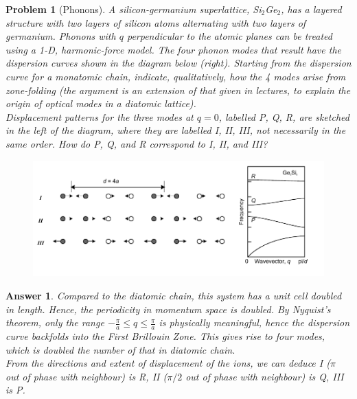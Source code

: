 \documentclass[a4paper]{article}
\newtheorem{ans}{Answer}[section]
\theoremstyle{new}
\newtheorem{qns}{Problem}[section]
\begin{document}
\begin{qns}[Phonons]
A silicon-germanium superlattice, Si$_2$Ge$_2$, has a layered structure with two layers of silicon atoms alternating with two layers of germanium. Phonons with $q$ perpendicular to the atomic planes can be treated using a 1-D, harmonic-force model. The four phonon modes that result have the dispersion curves shown in the diagram below (right). Starting from the dispersion curve for a monatomic chain, indicate, qualitatively, how the 4 modes arise from zone-folding (the argument is an extension of that given in lectures, to explain the origin of optical modes in a diatomic lattice).\\[5pt]
Displacement patterns for the three modes at $q = 0$, labelled P, Q, R, are sketched in the left of the diagram, where they are labelled I, II, III, not necessarily in the same order. How do P, Q, and R correspond to I, II, and III?
\begin{figure}[H]
    \centering
    \includegraphics[width=\linewidth]{4_5.PNG}
\end{figure}
\end{qns}
\begin{ans}
Compared to the diatomic chain, this system has a unit cell doubled in length. Hence, the periodicity in momentum space is doubled. By Nyquist's theorem, only the range $-\frac{\pi}{a}\leq q\leq\frac{\pi}{a}$ is physically meaningful, hence the dispersion curve backfolds into the First Brillouin Zone. This gives rise to four modes, which is doubled the number of that in diatomic chain.\\[5pt]
From the directions and extent of displacement of the ions, we can deduce I ($\pi$ out of phase with neighbour) is R, II ($\pi/2$ out of phase with neighbour) is Q, III is P.
\end{ans}
\newpage
\end{document}
